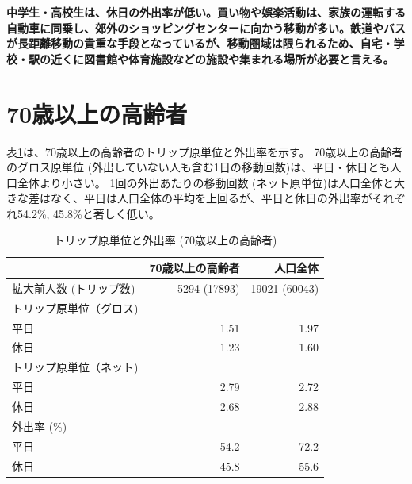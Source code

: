 \documentclass[a4paper,12pt, uplatex]{jsbook}
\begin{document}
\color{red}
\begin{framed}
\noindent
\textbf{\large 中学生・高校生は、休日の外出率が低い。買い物や娯楽活動は、家族の運転する自動車に同乗し、郊外のショッピングセンターに向かう移動が多い。鉄道やバスが長距離移動の貴重な手段となっているが、移動圏域は限られるため、自宅・学校・駅の近くに図書館や体育施設などの施設や集まれる場所が必要と言える。}
\end{framed}
\color{black}



\clearpage
\section{70歳以上の高齢者}

表\ref{tab:トリップ_外出率_高齢者}は、70歳以上の高齢者のトリップ原単位と外出率を示す。
70歳以上の高齢者のグロス原単位 (外出していない人も含む1日の移動回数)は、平日・休日とも人口全体より小さい。
1回の外出あたりの移動回数 (ネット原単位)は人口全体と大きな差はなく、平日は人口全体の平均を上回るが、平日と休日の外出率がそれぞれ54.2\%, 45.8\%と著しく低い。
%
\begin{table}[htbp]
\centering
\caption{トリップ原単位と外出率 (70歳以上の高齢者)}
\label{tab:トリップ_外出率_高齢者}
\begin{tabular}{lrr}
\toprule
& 70歳以上の高齢者 & 人口全体 \\
\midrule
拡大前人数 (トリップ数) & 5294 (17893) & 19021 (60043)\\
トリップ原単位（グロス) & & \\
\hspace{2em} 平日 & 1.51 & 1.97 \\
\hspace{2em} 休日 & 1.23 & 1.60 \\
トリップ原単位（ネット) & & \\
\hspace{2em} 平日 & 2.79 & 2.72 \\
\hspace{2em} 休日 & 2.68 & 2.88\\
外出率 (\%) & &  \\
\hspace{2em} 平日 & 54.2 & 72.2\\
\hspace{2em} 休日 & 45.8 & 55.6\\
\bottomrule
\end{tabular}
\end{table}
\end{document}
